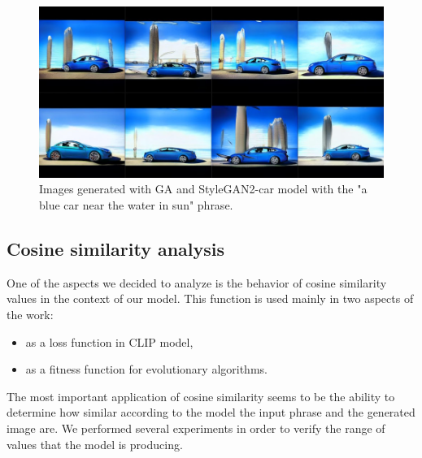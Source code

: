 \documentclass[12pt,a4paper,openany]{book}
\begin{document}
\begin{figure}[H]
    \centering
    \includegraphics[scale=0.6]{figs/bluecar.png}
    \caption{Images generated with GA and StyleGAN2-car model with the "a blue car near the water in sun" phrase.}\label{Fig:bluecar}
\end{figure}

\subsection*{Cosine similarity analysis}
\noindent One of the aspects we decided to analyze is the behavior of cosine similarity values in the context of our model. This function is used mainly in two aspects of the work:
\begin{itemize}
\item  as a loss function in CLIP model,
\item as a fitness function for evolutionary algorithms.
\end{itemize}
\noindent The most important application of cosine similarity seems to be the ability to determine how similar according to the model the input phrase and the generated image are.  We performed several experiments in order to verify the range of values that the model is producing.
\newline
\end{document}

